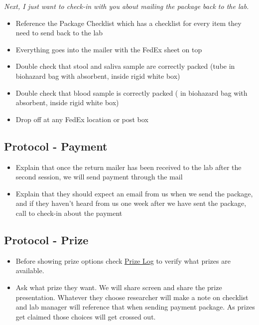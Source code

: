\documentclass[]{book}
\providecommand{\tightlist}{%
  \setlength{\itemsep}{0pt}\setlength{\parskip}{0pt}}
\begin{document}
\emph{Next, I just want to check-in with you about mailing the package back to the lab.}

\begin{itemize}
\item
  Reference the Package Checklist which has a checklist for every item they need to send back to the lab
\item
  Everything goes into the mailer with the FedEx sheet on top
\item
  Double check that stool and saliva sample are correctly packed (tube in biohazard bag with absorbent, inside rigid white box)
\item
  Double check that blood sample is correctly packed ( in biohazard bag with absorbent, inside rigid white box)
\item
  Drop off at any FedEx location or post box
\end{itemize}

\hypertarget{protocol---payment-2}{%
\subsection{Protocol - Payment}\label{protocol---payment-2}}

\begin{itemize}
\item
  Explain that once the return mailer has been received to the lab after the second session, we will send payment through the mail
\item
  Explain that they should expect an email from us when we send the package, and if they haven't heard from us one week after we have sent the package, call to check-in about the payment
\end{itemize}

\hypertarget{protocol---prize}{%
\subsection{Protocol - Prize}\label{protocol---prize}}

\begin{itemize}
\tightlist
\item
  Before showing prize options check \href{https://app.box.com/file/734579293509}{Prize Log} to verify what prizes are available.
\item
  Ask what prize they want. We will share screen and share the prize presentation. Whatever they choose researcher will make a note on checklist and lab manager will reference that when sending payment package. As prizes get claimed those choices will get crossed out.
\end{itemize}
\end{document}
